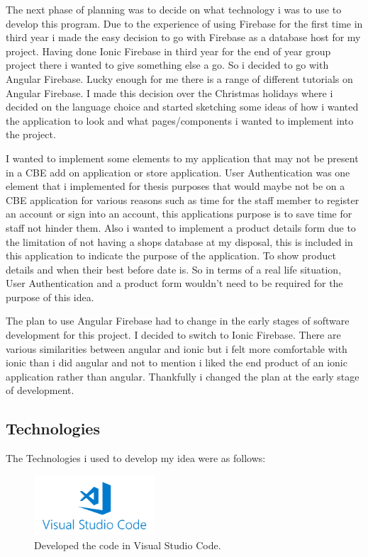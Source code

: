 The next phase of planning was to decide on what technology i was to use to develop this program. Due to the experience of using Firebase for the first time in third year i made the easy decision to go with Firebase as a database host for my project. Having done Ionic Firebase in third year for the end of year group project there i wanted to give something else a go. So i decided to go with Angular Firebase. Lucky enough for me there is a range of different tutorials on Angular Firebase. I made this decision over the Christmas holidays where i decided on the language choice and started sketching some ideas of how i wanted the application to look and what pages/components i wanted to implement into the project. 
\newline

I wanted to implement some elements to my application that may not be present in a CBE add on application or store application. User Authentication was one element that i implemented for thesis purposes that would maybe not be on a CBE application for various reasons such as time for the staff member to register an account or sign into an account, this applications purpose is to save time for staff not hinder them. Also i wanted to implement a product details form due to the limitation of not having a shops database at my disposal, this is included in this application to indicate the purpose of the application. To show product details and when their best before date is. So in terms of a real life situation, User Authentication and a product form wouldn't need to be required for the purpose of this idea. 
\newline

The plan to use Angular Firebase had to change in the early stages of software development for this project. I decided to switch to Ionic Firebase. There are various similarities between angular and ionic but i felt more comfortable with ionic than i did angular and not to mention i liked the end product of an ionic application rather than angular. Thankfully i changed the plan at the early stage of development.

\subsection{Technologies}
The Technologies i used to develop my idea were as follows:
\newline

\begin{figure}[h!]
	\caption{Developed the code in Visual Studio Code.}
	\label{image:vscode}
	\centering
	\includegraphics[width=0.4\textwidth]{images/vscode.png}
\end{figure}

